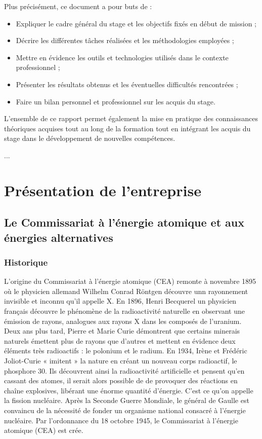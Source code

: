 \documentclass[12pt,a4paper]{report}
\begin{document}
Plus précisément, ce document a pour buts de :
\begin{itemize}
  \item Expliquer le cadre général du stage et les objectifs fixés en début de mission ;
  \item Décrire les différentes tâches réalisées et les méthodologies employées ;
  \item Mettre en évidence les outils et technologies utilisés dans le contexte professionnel ;
  \item Présenter les résultats obtenus et les éventuelles difficultés rencontrées ;
  \item Faire un bilan personnel et professionnel sur les acquis du stage.
\end{itemize}

L'ensemble de ce rapport permet également la mise en pratique des connaissances théoriques acquises tout au long de la formation tout en intégrant les acquis du stage dans le développement de nouvelles compétences.

... %

\chapter{Présentation de l'entreprise}
\section{Le Commissariat à l'énergie atomique et aux énergies alternatives}
\subsection{Historique}

L'origine du Commissariat à l’énergie atomique (CEA) remonte à novembre 1895 où le physicien allemand Wilhelm Conrad Röntgen découvre unn rayonnement invisible et inconnu qu'il appelle X. En 1896, Henri Becquerel un physicien français découvre le phénomène de la radioactivité naturelle en observant une émission de rayons, analogues aux rayons X dans les composés de l'uranium. Deux ans plus tard, Pierre et Marie Curie démontrent que certains minerais naturels émettent plus de rayons que d’autres et mettent en évidence deux éléments très radioactifs : le polonium et le radium. En 1934, Irène et Frédéric Joliot-Curie « imitent » la nature en créant un nouveau corps radioactif, le phosphore 30. Ils découvrent ainsi la radioactivité artificielle et pensent qu'en cassant des atomes, il serait alors possible de de provoquer des réactions en chaîne explosives, libérant une énorme quantité d’énergie. C'est ce qu'on appelle la fission nucléaire. Après la Seconde Guerre Mondiale, le général de Gaulle est convaincu de la nécessité de fonder un organisme national consacré à l'énergie nucléaire. Par l'ordonnance du 18 octobre 1945, le Commissariat à l’énergie atomique (CEA) est crée.
\end{document}
